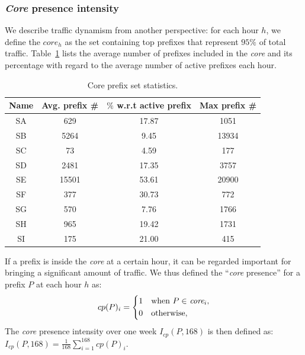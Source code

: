 \subsubsection{\textit{Core} presence intensity}

We describe traffic dynamism from another perspective:
for each hour $h$, we define the $core_h$ as the set containing top prefixes that represent $95\%$ of total traffic. 
Table~\ref{tab:core_size} lists the average number of prefixes included in the \textit{core} and its percentage with regard to the average number of active prefixes each hour. 

\begin{table}[!htb]
\centering
\footnotesize
\begin{tabular}{cccc}\toprule
\textbf{Name} & \textbf{Avg. prefix \#} & \textbf{$\%$ w.r.t active prefix} & \textbf{Max prefix \#}\\
\midrule
SA & 629  & 17.87  & 1051\\
SB & 5264 & 9.45  & 13934\\
SC & 73  & 4.59    & 177\\
SD & 2481  & 17.35 & 3757\\
SE & 15501  & 53.61 & 20900\\
SF & 377  & 30.73    & 772\\
SG & 570 & 7.76    & 1766\\
SH & 965  & 19.42   & 1731\\
SI & 175  & 21.00    & 415\\
\bottomrule
\end{tabular}
\caption{Core prefix set statistics.}
\label{tab:core_size}
\end{table}

If a prefix is inside the \textit{core} at a certain hour, it can be regarded important for bringing a significant amount of traffic.
We thus defined the ``\textit{core} presence'' for a prefix $P$ at each hour $h$ as:
\begin{equation*}
cp(P)_i = \begin{dcases*}
        1  & when $P \in$ $\textit{core}_i$,\\
        0 & otherwise,
        \end{dcases*}
\label{eq:cp}
\end{equation*}
The \textit{core} presence intensity over one week $I_{cp}(P, 168)$ is then defined as:
$I_{cp}(P,168) = \frac{1}{168} \sum_{i=1}^{168} cp(P)_i$.

